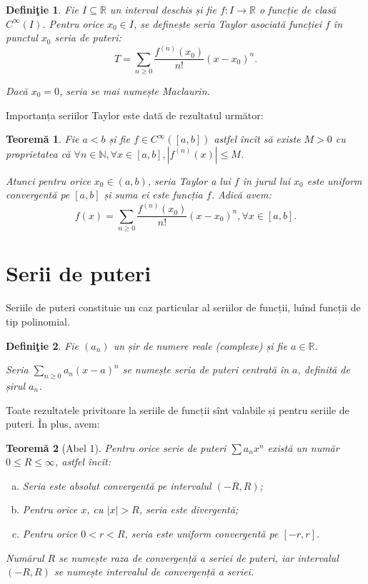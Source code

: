 \documentclass[11pt,a4paper]{article}
\newcommand\ds{\displaystyle}
\newcommand\seq{\subseteq}
\newcommand\NN{\mathbb{N}}
\newcommand\RR{\mathbb{R}}
\theoremstyle{dotless}
\newtheorem{theorem}{Teorem\u{a}}[section]
\theoremstyle{dotlessdr}
\newtheorem{definition}{Defini\c{t}ie}[section]
\begin{document}
\begin{definition}\label{def:seria-taylor}
  Fie $I \seq \RR$ un interval deschis și fie $f : I \to \RR$ o funcție de clasă
  $C^\infty(I)$. Pentru orice $x_0 \in I$, se definește \emph{seria Taylor} asociată
  funcției $f$ în punctul $x_0$ seria de puteri:
  \[
    T = \sum_{n \geq 0} \frac{f^{(n)}(x_0)}{n!} (x - x_0)^n.
  \]

  Dacă $x_0 = 0$, seria se mai numește \emph{Maclaurin}.
\end{definition}

Importanța seriilor Taylor este dată de rezultatul următor:

\begin{theorem}\label{thm:serie-taylor}
  Fie $a < b$ și fie $f \in C^\infty([a, b])$ astfel încît să existe $M > 0$ cu
  proprietatea că $\forall n \in \NN, \forall x \in [a, b], |f^{(n)}(x) | \leq M$.

  Atunci pentru orice $x_0 \in (a, b)$, seria Taylor a lui $f$ în jurul lui $x_0$
  este uniform convergentă pe $[a, b]$ și suma ei este funcția $f$. Adică avem:
  \[
    f(x) = \sum_{n \geq 0} \frac{f^{(n)}(x_0)}{n!} (x - x_0)^n, \forall x \in [a, b].
  \]
\end{theorem}


\section{Serii de puteri}
\label{sec:serii-puteri}

Seriile de puteri constituie un caz particular al seriilor de funcții, luînd funcții
de tip polinomial.

\begin{definition}\label{def:serii-p}
  Fie $(a_n)$ un șir de numere reale (complexe) și fie $a \in \RR$.

  Seria $\ds\sum_{n \geq 0} a_n(x - a)^n$ se numește \emph{seria de puteri centrată în $a$},
  definită de șirul $a_n$.
\end{definition}

Toate rezultatele privitoare la seriile de funcții sînt valabile și pentru seriile de
puteri. În plus, avem:

\begin{theorem}[Abel 1]\label{thm:abel-1}
  Pentru orice serie de puteri $\sum a_nx^n$ există un număr $0 \leq R \leq \infty$,
  astfel încît:
  \begin{enumerate}[(a)]
  \item Seria este absolut convergentă pe intervalul $(-R, R)$;
  \item Pentru orice $x$, cu $|x| > R$, seria este divergentă;
  \item Pentru orice $0 < r < R$, seria este uniform convergentă pe $[-r, r]$.
  \end{enumerate}

  Numărul $R$ se numește \emph{raza de convergență} a seriei de puteri, iar intervalul
  $(-R, R)$ se numește \emph{intervalul de convergență} a seriei.
\end{theorem}
\end{document}
